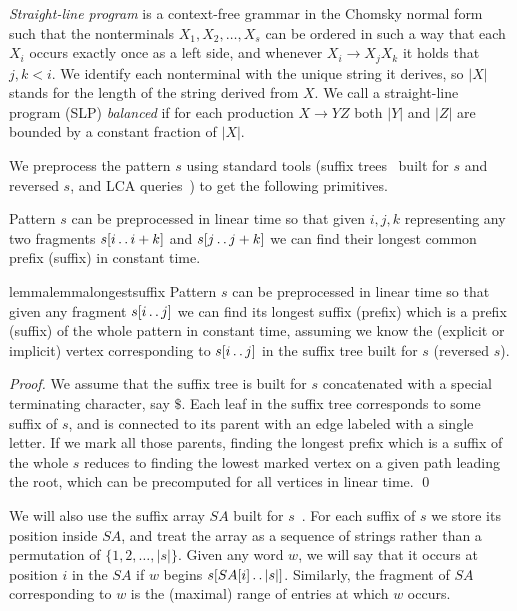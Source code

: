 \documentclass[runningheads]{llncs}
\newcommand{\twodots}{\mathinner{\ldotp\ldotp}}
\begin{document}
{\it Straight-line program} is a context-free grammar in the Chomsky normal form such that the nonterminals $X_1,X_2,\ldots,X_s$ can be ordered in such a way that each $X_i$ occurs exactly once as a left side, and whenever $X_i\rightarrow X_j X_k$ it holds that $j,k<i$. We identify each nonterminal with the unique string it derives, so $|X|$ stands for the length of the string derived from $X$. We call a straight-line program (SLP) {\it balanced} if for each production $X\rightarrow YZ$ both $|Y|$ and $|Z|$ are bounded by a constant fraction of $|X|$.

We preprocess the pattern $s$ using standard tools (suffix trees~\cite{Ukkonen} built for $s$ and reversed $s$, and LCA queries~\cite{BenderLCA}) to get the following primitives.

\begin{lemma}\label{lemma:equality}
Pattern $s$ can be preprocessed in linear time so that given $i,j,k$ representing any two fragments $s[i\twodots i+k]$ and $s[j\twodots j+k]$ we can find their longest common prefix (suffix) in constant time.
\end{lemma}

\begin{restatable}{lemma}{lemmalongestsuffix}
\label{lemma:longest suffix}
Pattern $s$ can be preprocessed in linear time so that given any fragment $s[i\twodots j]$ we can find its longest suffix (prefix) which is a prefix (suffix) of the whole pattern in constant time, assuming we know the (explicit or implicit) vertex corresponding to $s[i\twodots j]$ in the suffix tree built for $s$ (reversed $s$).
\end{restatable}

\begin{proof}
We assume that the suffix tree is built for $s$ concatenated with a special terminating character, say $\$$. Each leaf in the suffix tree corresponds to some suffix of $s$, and is connected to its parent with an edge labeled with a single letter. If we mark all those parents, finding the longest prefix which is a suffix of the whole $s$ reduces to finding the lowest marked vertex on a given path leading the root, which can be precomputed for all vertices in linear time.
\qed
\end{proof}

We will also use the suffix array $SA$ built for $s$~\cite{Karkainnen}. For each suffix of $s$ we store its position inside $SA$, and treat the array as a sequence of strings rather than a permutation of $\{1,2,\ldots,|s|\}$. Given any word $w$, we will say that it occurs at position $i$ in the $SA$ if $w$ begins $s[SA[i]\twodots |s|]$. Similarly, the fragment of $SA$ corresponding to $w$ is the (maximal) range of entries at which $w$ occurs.
\end{document}
